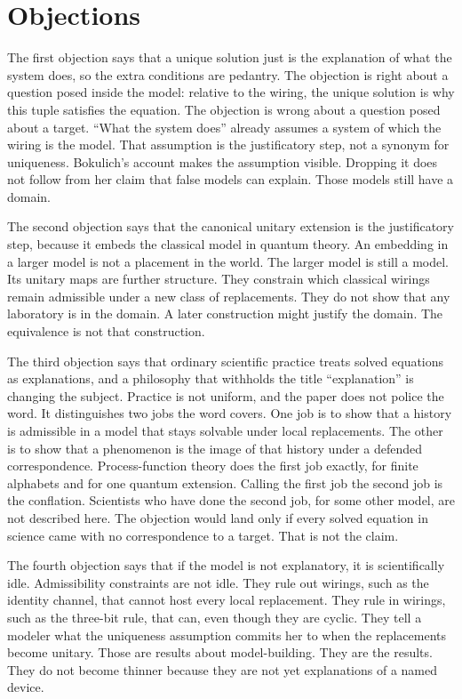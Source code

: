\documentclass[12pt]{article}
\begin{document}
\section{Objections}
\label{sec:obj}

The first objection says that a unique solution just is the explanation of what the system does, so the extra conditions are pedantry. The objection is right about a question posed inside the model: relative to the wiring, the unique solution is why this tuple satisfies the equation. The objection is wrong about a question posed about a target. ``What the system does'' already assumes a system of which the wiring is the model. That assumption is the justificatory step, not a synonym for uniqueness. Bokulich's account makes the assumption visible. Dropping it does not follow from her claim that false models can explain. Those models still have a domain.

The second objection says that the canonical unitary extension is the justificatory step, because it embeds the classical model in quantum theory. An embedding in a larger model is not a placement in the world. The larger model is still a model. Its unitary maps are further structure. They constrain which classical wirings remain admissible under a new class of replacements. They do not show that any laboratory is in the domain. A later construction might justify the domain. The equivalence is not that construction.

The third objection says that ordinary scientific practice treats solved equations as explanations, and a philosophy that withholds the title ``explanation'' is changing the subject. Practice is not uniform, and the paper does not police the word. It distinguishes two jobs the word covers. One job is to show that a history is admissible in a model that stays solvable under local replacements. The other is to show that a phenomenon is the image of that history under a defended correspondence. Process-function theory does the first job exactly, for finite alphabets and for one quantum extension. Calling the first job the second job is the conflation. Scientists who have done the second job, for some other model, are not described here. The objection would land only if every solved equation in science came with no correspondence to a target. That is not the claim.

The fourth objection says that if the model is not explanatory, it is scientifically idle. Admissibility constraints are not idle. They rule out wirings, such as the identity channel, that cannot host every local replacement. They rule in wirings, such as the three-bit rule, that can, even though they are cyclic. They tell a modeler what the uniqueness assumption commits her to when the replacements become unitary. Those are results about model-building. They are the results. They do not become thinner because they are not yet explanations of a named device.
\end{document}
